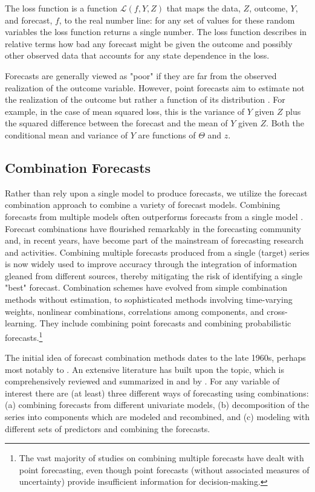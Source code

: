 \documentclass[
a4paper, %
12pt, %
]{CascadeAnalyticsWPS}
\begin{document}
The loss function is a function $\mathcal{L}(f, Y, Z)$ that maps the data, $Z$, outcome, $Y$, and forecast, $f$, to the real number line: for any set of values for these random variables the loss function returns a single number. The loss function describes in relative terms how bad any forecast might be given the outcome and possibly other observed data that accounts for any state dependence in the loss.

Forecasts are generally viewed as "poor" if they are far from the observed realization of the outcome variable. However, point forecasts aim to estimate not the realization of the outcome but rather a function of its distribution \citep{elliot_2008, barrow2016}. For example, in the case of mean squared loss, this is the variance of $Y$ given $Z$ plus the squared difference between the forecast and the mean of $Y$ given $Z$. Both the conditional mean and variance of $Y$ are functions of $\Theta$ and $z$.

\subsection{Combination Forecasts}
\label{sec:sec3.2}
Rather than rely upon a single model to produce forecasts, we utilize the forecast combination approach to combine a variety of forecast models. Combining forecasts from multiple models often outperforms forecasts from a single
model \citep{clemen86, elliott_handbook_2013}. Forecast combinations have flourished remarkably in the forecasting community and, in recent years, have become part of the mainstream of forecasting research and activities. Combining multiple forecasts produced from a single (target) series is now widely used to improve accuracy through the integration of information gleaned from different sources, thereby mitigating the risk of identifying a single "best" forecast. Combination schemes have evolved from simple combination methods without estimation, to sophisticated methods involving time-varying weights, nonlinear combinations, correlations among components, and cross-learning. They include combining point forecasts and combining probabilistic forecasts.\footnote{The vast majority of studies on combining multiple forecasts have dealt with point forecasting, even
though point forecasts (without associated measures of uncertainty) provide insufficient information for decision-making. } 


The initial idea of forecast combination methods dates to the late 1960s, perhaps most notably to \cite{bates_combination_1969}. An extensive literature has built upon the topic, which is comprehensively reviewed and summarized in \cite{elliott_handbook_2013} and by \cite{WANG2022}. For any variable of interest there are (at least) three different ways of forecasting using combinations: (a) combining forecasts from different univariate models, (b) decomposition of the series into components which are modeled and recombined, and (c) modeling with different sets of predictors and combining the forecasts. 
\end{document}
